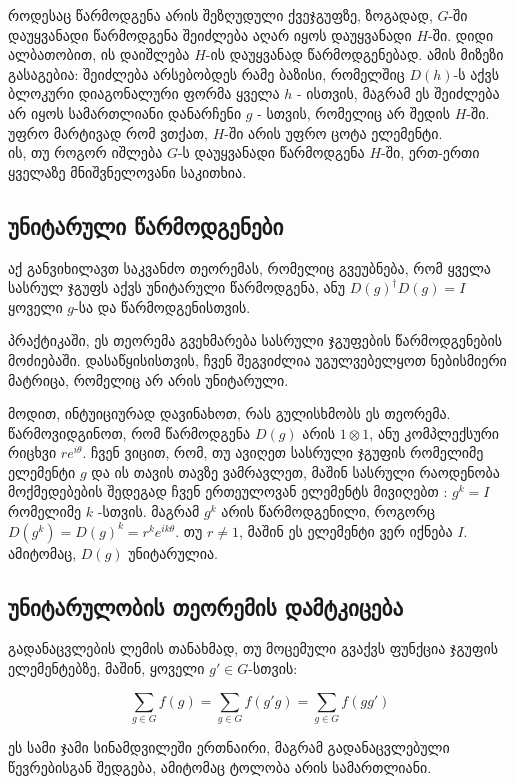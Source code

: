 \documentclass[12pt]{article}
\begin{document}
\begin{sloppypar}
როდესაც წარმოდგენა არის შეზღუდული ქვეჯგუფზე, ზოგადად, $G$-ში დაუყვანადი წარმოდგენა შეიძლება აღარ იყოს დაუყვანადი $H$-ში. დიდი ალბათობით, ის დაიშლება $H$-ის დაუყვანად წარმოდგენებად. ამის მიზეზი გასაგებია: შეიძლება არსებობდეს რამე ბაზისი, რომელშიც $D(h)$-ს აქვს ბლოკური დიაგონალური ფორმა ყველა $h$ - ისთვის, მაგრამ ეს შეიძლება არ იყოს სამართლიანი დანარჩენი $g$ - სთვის, რომელიც არ შედის $H$-ში. უფრო მარტივად რომ ვთქათ, $H$-ში არის უფრო ცოტა ელემენტი.\\

ის, თუ როგორ იშლება $G$-ს დაუყვანადი წარმოდგენა $H$-ში, ერთ-ერთი ყველაზე მნიშვნელოვანი საკითხია.

\subsection{უნიტარული წარმოდგენები}

აქ განვიხილავთ საკვანძო თეორემას, რომელიც გვეუბნება, რომ ყველა სასრულ ჯგუფს აქვს უნიტარული წარმოდგენა, ანუ $D(g)^{\dagger}D(g)=I$ ყოველი $g$-სა და წარმოდგენისთვის.

პრაქტიკაში, ეს თეორემა გვეხმარება სასრული ჯგუფების წარმოდგენების მოძიებაში. დასაწყისისთვის, ჩვენ შეგვიძლია უგულვებელყოთ ნებისმიერი მატრიცა, რომელიც არ არის უნიტარული.

მოდით, ინტუიციურად დავინახოთ, რას გულისხმობს ეს თეორემა. წარმოვიდგინოთ, რომ წარმოდგენა $D(g)$ არის $1\otimes 1$, ანუ კომპლექსური რიცხვი $re^{i\theta}$. ჩვენ ვიცით, რომ, თუ ავიღეთ სასრული ჯგუფის რომელიმე ელემენტი $g$ და ის თავის თავზე ვამრავლეთ, მაშინ სასრული რაოდენობა მოქმედებების შედეგად ჩვენ ერთეულოვან ელემენტს მივიღებთ : $g^k=I$ რომელიმე $k$ -სთვის. მაგრამ $g^k$ არის წარმოდგენილი, როგორც $D(g^k)= D(g)^k = r^ke^{ik\theta}$. თუ $r \neq 1$, მაშინ ეს ელემენტი ვერ იქნება $I$. ამიტომაც, $D(g)$ უნიტარულია.
 
\subsection{უნიტარულობის თეორემის დამტკიცება}

გადანაცვლების ლემის თანახმად, თუ მოცემული გვაქვს ფუნქცია ჯგუფის ელემენტებზე, მაშინ, ყოველი $g' \in G$-სთვის:

\begin{equation} \label{Rearrangement lemma}
		\sum_{g \in G}f(g) = \sum_{g \in G}f(g'g) = \sum_{g \in G}f(gg')
\end{equation}

ეს სამი ჯამი სინამდვილეში ერთნაირი, მაგრამ გადანაცვლებული წევრებისგან შედგება, ამიტომაც ტოლობა არის სამართლიანი.\\


\end{sloppypar}
\end{document}
